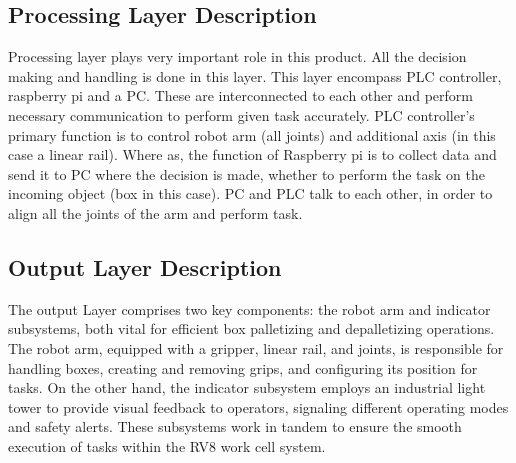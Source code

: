 \subsection{Processing Layer Description}
Processing layer plays very important role in this product. All the decision making and handling is done in this layer. This layer encompass PLC controller, raspberry pi and a PC. These are interconnected to each other and perform necessary communication to perform given task accurately. PLC controller's primary function is to control robot arm (all joints) and additional axis (in this case a linear rail). Where as, the function of Raspberry pi is to collect data and send it to PC where the decision is made, whether to perform the task on the incoming object (box in this case). PC and PLC talk to each other, in order to align all the joints of the arm and perform task.

\subsection{Output Layer Description}
The output Layer comprises two key components: the robot arm and indicator subsystems, both vital for efficient box palletizing and depalletizing operations. The robot arm, equipped with a gripper, linear rail, and joints, is responsible for handling boxes, creating and removing grips, and configuring its position for tasks. On the other hand, the indicator subsystem employs an industrial light tower to provide visual feedback to operators, signaling different operating modes and safety alerts. These subsystems work in tandem to ensure the smooth execution of tasks within the RV8 work cell system.

